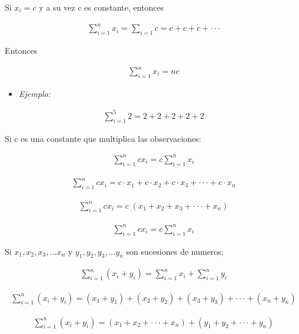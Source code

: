 \documentclass[twocolumn]{article}
\providecommand{\tightlist}{%
  \setlength{\itemsep}{0pt}\setlength{\parskip}{0pt}}
\begin{document}
Si \(x_i = c\) y a su vez c es constante, entonces

\begin{align}
\sum_{i=1}^ n x_i = \sum_{i=1} c = c + c + c +  \cdot \cdot \cdot 
\end{align}

Entonces

\begin{align}
\sum_{i=1}^n x_i = nc
\end{align}

\begin{itemize}
\tightlist
\item
  \emph{Ejemplo:}
\end{itemize}

\begin{align}
\sum_{i=1}^5 2 = 2 + 2 + 2 + 2 + 2
\end{align}

Si c es una constante que multiplica las observaciones:

\begin{align}
\sum_{i=1}^n c x_i = c \sum_{i=1}^n x_i
\end{align}

\begin{align}
\sum_{i=1}^n c x_i = c \cdot x_1 + c \cdot x_2 + c \cdot x_3 + \cdot \cdot \cdot + c \cdot x_n
\end{align}

\begin{align}
\sum_{i=1}^n c x_i = c \; (x_1 +   x_2 +  x_3 + \cdot \cdot \cdot +   x_n)
\end{align}

\begin{align}
\sum_{i=1}^n c x_i = c \sum_{i=1}^n x_i
\end{align}

Si \(x_1, x_2, x_3,...x_n\) y \(y_1, y_2, y_3,...y_n\) son sucesiones de
numeros;

\begin{align}
\sum_{i=1}^n (x_i + y_i) =  \sum_{i=1}^n x_i + \sum_{i=1}^n y_i
\end{align}

\begin{align}
\sum_{i=1}^n (x_i + y_i) =  (x_1 + y_1) 
+ (x_2 + y_2) + (x_3 + y_3) + \cdot \cdot \cdot + (x_n + y_n)
\end{align}

\begin{align}
\sum_{i=1}^n (x_i + y_i) =  (x_1 + x_2 + \cdot \cdot \cdot + x_n ) + (y_1 + y_2 + \cdot \cdot \cdot + y_n )
\end{align}
\end{document}
